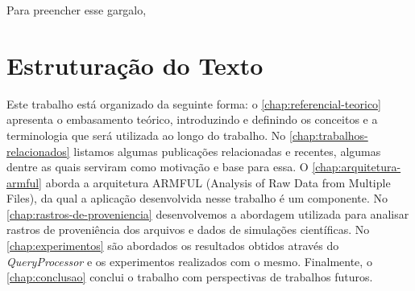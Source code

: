 Para preencher esse gargalo, 






\section{Estruturação do Texto}

Este trabalho está organizado da seguinte forma:
o \autoref{chap:referencial-teorico} apresenta o embasamento teórico, introduzindo e definindo os conceitos e a terminologia que será utilizada ao longo do trabalho.
No \autoref{chap:trabalhos-relacionados} listamos algumas publicações relacionadas e recentes, algumas dentre as quais serviram como motivação e base para essa.
O \autoref{chap:arquitetura-armful} aborda a arquitetura  ARMFUL (Analysis of Raw Data from Multiple Files), da qual a aplicação desenvolvida nesse trabalho é um componente.
No \autoref{chap:rastros-de-proveniencia} desenvolvemos a abordagem utilizada para analisar rastros de proveniência dos arquivos e dados de simulações científicas.
No \autoref{chap:experimentos} são abordados os resultados obtidos através do \textit{QueryProcessor} e os experimentos realizados com o mesmo.
Finalmente, o \autoref{chap:conclusao} conclui o trabalho com perspectivas de trabalhos futuros.
